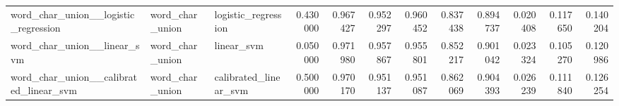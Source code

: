 \begin{tabular}{lllrrrrrrrrr}
word_char_union__logistic_regression & word_char_union & logistic_regression & 0.430000 & 0.967427 & 0.952297 & 0.960452 & 0.837438 & 0.894737 & 0.020408 & 0.117650 & 0.140204 \\
word_char_union__linear_svm & word_char_union & linear_svm & 0.050000 & 0.971980 & 0.957867 & 0.955801 & 0.852217 & 0.901042 & 0.023324 & 0.105270 & 0.120986 \\
word_char_union__calibrated_linear_svm & word_char_union & calibrated_linear_svm & 0.500000 & 0.970170 & 0.951137 & 0.951087 & 0.862069 & 0.904393 & 0.026239 & 0.111840 & 0.126254 \\
\bottomrule
\end{tabular}
